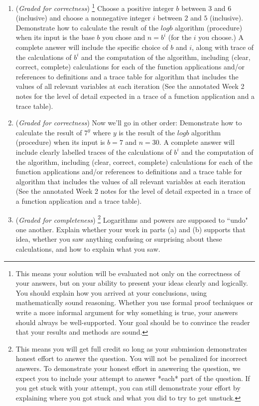 \documentclass[12pt, oneside]{article}
\newcommand{\gradeCorrect}{({\it Graded for correctness}) }
\newcommand{\gradeCorrectFirst}{\gradeCorrect\footnote{This means your solution 
will be evaluated not only on the correctness of your answers, but on your ability
to present your ideas clearly and logically. You should explain how you 
arrived at your conclusions, using
mathematically sound reasoning. Whether you use formal proof techniques or 
write a more informal argument
for why something is true, your answers should always be well-supported. 
Your goal should be to convince the
reader that your results and methods are sound.} }
\newcommand{\gradeComplete}{({\it Graded for completeness}) }
\newcommand{\gradeCompleteFirst}{\gradeComplete\footnote{This means you will 
get full credit so long as your submission demonstrates honest effort to 
answer the question. You will not be penalized for incorrect answers. 
To demonstrate your honest effort in answering the question, we 
expect you to include your attempt to answer *each* part of the question. 
If you get stuck with your attempt, you can still demonstrate 
your effort by explaining where you got stuck and what 
you did to try to get unstuck.} }
\begin{document}
\begin{enumerate}[labelindent=0pt, leftmargin=0pt]
    \begin{enumerate}
    \item\gradeCorrectFirst Choose a positive integer $b$ between $3$ and $6$ (inclusive) and choose a 
    nonnegative integer $i$ between $2$ and $5$ (inclusive). Demonstrate how to calculate 
    the result of the $logb$ algorithm (procedure) when its input is the base $b$ you chose and
    $n = b^i$ (for the $i$ you choose.) 
    A complete answer will include the specific choice of $b$ and $i$, along with 
    trace of the calculations of $b^i$ and the computation of the algorithm, including 
    (clear, correct, complete) calculations for each of the function applications 
    and/or references to definitions and a trace table for algorithm that includes the values of all relevant 
    variables at each iteration (See the annotated Week 2 notes for the level of detail expected
    in a trace of a function application and a trace table).
    \item\gradeCorrect Now we'll go in other order: Demonstrate how to calculate the result of 
    $7^y$ where $y$ is the result of the $logb$ algorithm (procedure) when its input is $b=7$ and $n=30$.
    A complete answer will include clearly labelled 
    traces of the calculations of $b^i$ and the computation of the algorithm, including 
    (clear, correct, complete) calculations for each of the function applications 
    and/or references to definitions and a trace table for algorithm that includes the values of all relevant 
    variables at each iteration (See the annotated Week 2 notes for the level of detail expected
    in a trace of a function application and a trace table).    
    \item\gradeCompleteFirst Logarithms and powers are supposed to ``undo" one another. Explain whether your work in parts (a) and (b)
    supports that idea,  whether you saw anything confusing or surprising about these calculations, and how to explain what you saw.
    \end{enumerate}


\end{enumerate}
\end{document}
